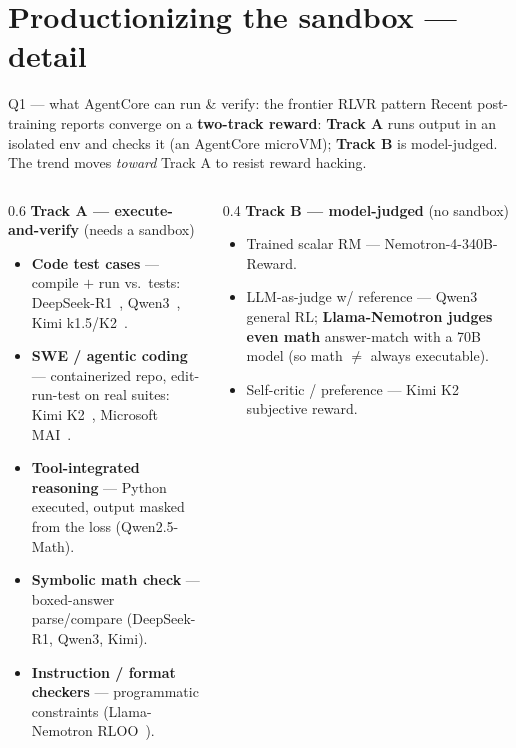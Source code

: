 \documentclass[aspectratio=169]{beamer}
\begin{document}
\section{Productionizing the sandbox --- detail}

\begin{frame}{Q1 --- what AgentCore can run \& verify: the frontier RLVR pattern}
  \footnotesize Recent post-training reports converge on a \textbf{two-track reward}: \textbf{Track A}
  runs output in an isolated env and checks it (an AgentCore microVM); \textbf{Track B} is model-judged.
  The trend moves \emph{toward} Track A to resist reward hacking.
  \begin{columns}[T]
    \begin{column}{0.6\textwidth}
      \textbf{Track A --- execute-and-verify} (needs a sandbox)
      \begin{itemize}\scriptsize\setlength\itemsep{0em}
        \item \textbf{Code test cases} --- compile $+$ run vs.\ tests: DeepSeek-R1~\cite{deepseekr1},
          Qwen3~\cite{qwen3}, Kimi k1.5/K2~\cite{kimik2}.
        \item \textbf{SWE / agentic coding} --- containerized repo, edit-run-test on real suites:
          Kimi K2~\cite{kimik2}, Microsoft MAI~\cite{mai}.
        \item \textbf{Tool-integrated reasoning} --- Python executed, output masked from the loss (Qwen2.5-Math).
        \item \textbf{Symbolic math check} --- boxed-answer parse/compare (DeepSeek-R1, Qwen3, Kimi).
        \item \textbf{Instruction / format checkers} --- programmatic constraints (Llama-Nemotron RLOO~\cite{llamanemotron}).
      \end{itemize}
    \end{column}
    \begin{column}{0.4\textwidth}
      \textbf{Track B --- model-judged} (no sandbox)
      \begin{itemize}\scriptsize\setlength\itemsep{0.03em}
        \item Trained scalar RM --- Nemotron-4-340B-Reward.
        \item LLM-as-judge w/ reference --- Qwen3 general RL; \textbf{Llama-Nemotron judges even math}
          answer-match with a 70B model (so math $\ne$ always executable).
        \item Self-critic / preference --- Kimi K2 subjective reward.

\end{itemize}
\end{column}
\end{columns}
\end{frame}
\end{document}
